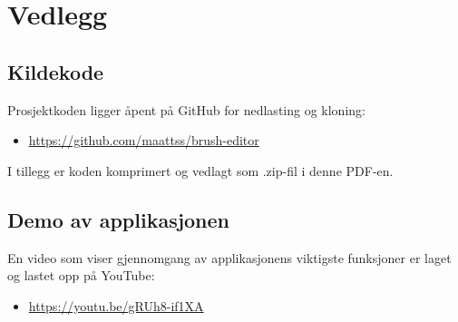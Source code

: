 \chapter{Vedlegg}
\section{Kildekode}
\label{vedleggA} %
Prosjektkoden ligger åpent på GitHub for nedlasting og kloning: 
\begin{itemize}
    \item \href{https://github.com/maattss/brush-editor}{https://github.com/maattss/brush-editor}
\end{itemize}
\noindent I tillegg er koden komprimert og vedlagt som .zip-fil i denne PDF-en. 

\section{Demo av applikasjonen}
\label{demo}
En video som viser gjennomgang av applikasjonens viktigste funksjoner er laget og lastet opp på YouTube:
\begin{itemize}
    \item \href{https://youtu.be/gRUh8-if1XA}{https://youtu.be/gRUh8-if1XA}
\end{itemize}
